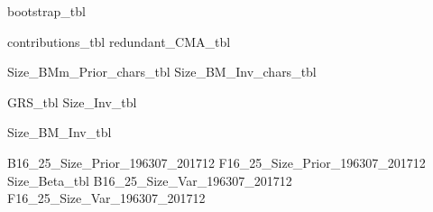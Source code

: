 



\begin{landscape}
{bootstrap_tbl}
\end{landscape}
{contributions_tbl}
{redundant_CMA_tbl}

{Size_BMm_Prior_chars_tbl}
{Size_BM_Inv_chars_tbl}

{GRS_tbl}
{Size_Inv_tbl}
\begin{landscape}
{Size_BM_Inv_tbl}
\end{landscape}
{B16_25_Size_Prior_196307_201712}
{F16_25_Size_Prior_196307_201712}
{Size_Beta_tbl}
{B16_25_Size_Var_196307_201712}
{F16_25_Size_Var_196307_201712}
